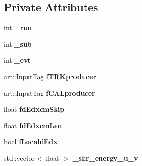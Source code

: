 \subsection*{Private Attributes}
\begin{DoxyCompactItemize}
\item 
int {\bfseries \+\_\+run}\hypertarget{classanalysis_1_1ShowerAnalysis_a7eb3a09edc99994f2df3701b2cb390ba}{}\label{classanalysis_1_1ShowerAnalysis_a7eb3a09edc99994f2df3701b2cb390ba}

\item 
int {\bfseries \+\_\+sub}\hypertarget{classanalysis_1_1ShowerAnalysis_a7f808f1e8a5bb637e41b3d523a4cfe32}{}\label{classanalysis_1_1ShowerAnalysis_a7f808f1e8a5bb637e41b3d523a4cfe32}

\item 
int {\bfseries \+\_\+evt}\hypertarget{classanalysis_1_1ShowerAnalysis_a5285cb23ec194c9142e828be70b58f2b}{}\label{classanalysis_1_1ShowerAnalysis_a5285cb23ec194c9142e828be70b58f2b}

\item 
art\+::\+Input\+Tag {\bfseries f\+T\+R\+Kproducer}\hypertarget{classanalysis_1_1ShowerAnalysis_aaf85b896fee0cd1a3f089e14c48d6849}{}\label{classanalysis_1_1ShowerAnalysis_aaf85b896fee0cd1a3f089e14c48d6849}

\item 
art\+::\+Input\+Tag {\bfseries f\+C\+A\+Lproducer}\hypertarget{classanalysis_1_1ShowerAnalysis_afc78776f278428b5919f03dc97d71789}{}\label{classanalysis_1_1ShowerAnalysis_afc78776f278428b5919f03dc97d71789}

\item 
float {\bfseries fd\+Edxcm\+Skip}\hypertarget{classanalysis_1_1ShowerAnalysis_ae76cc91bf9dd3bab97ed53f060d25e6b}{}\label{classanalysis_1_1ShowerAnalysis_ae76cc91bf9dd3bab97ed53f060d25e6b}

\item 
float {\bfseries fd\+Edxcm\+Len}\hypertarget{classanalysis_1_1ShowerAnalysis_a2e56492daf7133eb5243653389fe98c6}{}\label{classanalysis_1_1ShowerAnalysis_a2e56492daf7133eb5243653389fe98c6}

\item 
bool {\bfseries f\+Locald\+Edx}\hypertarget{classanalysis_1_1ShowerAnalysis_ae952c38c8393682df6d40b1bcca95ba5}{}\label{classanalysis_1_1ShowerAnalysis_ae952c38c8393682df6d40b1bcca95ba5}

\item 
std\+::vector$<$ float $>$ {\bfseries \+\_\+shr\+\_\+energy\+\_\+u\+\_\+v}\hypertarget{classanalysis_1_1ShowerAnalysis_a0aae9ad74279a378774ca23acf1e0d39}{}\label{classanalysis_1_1ShowerAnalysis_a0aae9ad74279a378774ca23acf1e0d39}


\end{DoxyCompactItemize}
